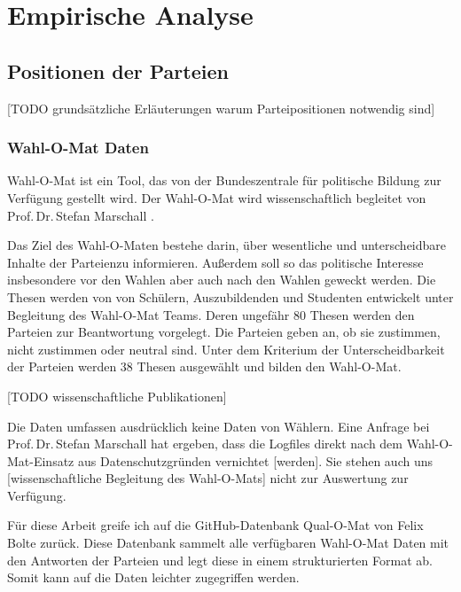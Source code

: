 
\chapter{Empirische Analyse}\label{Kap-Empirische-Analyse}

\section{Positionen der Parteien}\label{Sec-Parteienpositionen}

[TODO grundsätzliche Erläuterungen warum Parteipositionen notwendig sind]

\subsection{Wahl-O-Mat Daten}
Wahl-O-Mat \citep{WahlOMat} ist ein Tool, das von der Bundeszentrale für politische Bildung zur Verfügung gestellt wird. Der Wahl-O-Mat wird wissenschaftlich begleitet von Prof.\,Dr.\,Stefan Marschall \citep{MarschallWahlOMat}.

Das Ziel des Wahl-O-Maten bestehe darin, über \glqq wesentliche und unterscheidbare Inhalte der Parteien\grqq zu informieren. Außerdem soll so das politische Interesse insbesondere vor den Wahlen aber auch nach den Wahlen geweckt werden. 
Die Thesen werden von von Schülern, Auszubildenden und Studenten entwickelt unter Begleitung des Wahl-O-Mat Teams. Deren ungefähr 80 Thesen werden den Parteien zur Beantwortung vorgelegt. Die Parteien geben an, ob sie zustimmen, nicht zustimmen oder neutral sind. Unter dem Kriterium der Unterscheidbarkeit der Parteien werden  38 Thesen ausgewählt und bilden den Wahl-O-Mat. %

[TODO wissenschaftliche Publikationen]

Die Daten umfassen ausdrücklich keine Daten von Wählern. Eine Anfrage bei Prof.\,Dr.\,Stefan Marschall hat ergeben, dass \glqq die Logfiles direkt nach dem Wahl-O-Mat-Einsatz aus Datenschutzgründen vernichtet [werden]. Sie stehen auch uns [wissenschaftliche Begleitung des Wahl-O-Mats] nicht zur Auswertung zur Verfügung.\grqq

Für diese Arbeit greife ich auf die GitHub-Datenbank Qual-O-Mat von Felix Bolte \citep{Bolte2022QualOMat} zurück. Diese Datenbank sammelt alle verfügbaren Wahl-O-Mat Daten mit den Antworten der Parteien und legt diese in einem strukturierten Format ab. Somit kann auf die Daten leichter zugegriffen werden.


